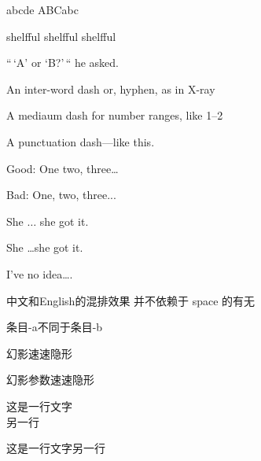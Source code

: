 \documentclass[UTF8]{article}
\begin{document}
\textgreek{abcde}
{\selectfont ABCabc}

shelfful shelf{}ful shelf\/ful %

``\,`A' or `B?'\,`` he asked.

An inter-word dash or, hyphen, as in X-ray

A mediaum dash for number ranges, like 1--2

A punctuation dash---like this.

Good: One two, three\dots %

Bad: One, two, three...

She $\ldots$ she got it. %

She \ldots she got it.

I've no idea\ldots.

中文和English的混排效果
并不依赖于 space 的有无


\mbox{条目}-a不同于条目-b

幻影\phantom{参数}速速隐形

幻影参数速速隐形

这是一行文字\\另一行

这是一行文字\linebreak 另一行
\end{document}
